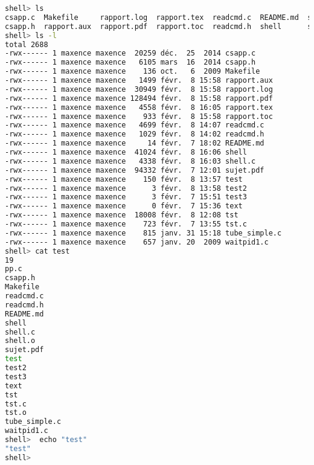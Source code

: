 \documentclass{report}
\begin{document}
		\begin{lstlisting}[frame=single,basicstyle=\footnotesize,language=bash]
shell> ls
csapp.c  Makefile     rapport.log  rapport.tex	readcmd.c  README.md  shell.c	 test	test3  tst    tube_simple.c
csapp.h  rapport.aux  rapport.pdf  rapport.toc	readcmd.h  shell      sujet.pdf  test2	text   tst.c  waitpid1.c
shell> ls -l
total 2688
-rwx------ 1 maxence maxence  20259 déc.  25  2014 csapp.c
-rwx------ 1 maxence maxence   6105 mars  16  2014 csapp.h
-rwx------ 1 maxence maxence    136 oct.   6  2009 Makefile
-rwx------ 1 maxence maxence   1499 févr.  8 15:58 rapport.aux
-rwx------ 1 maxence maxence  30949 févr.  8 15:58 rapport.log
-rwx------ 1 maxence maxence 128494 févr.  8 15:58 rapport.pdf
-rwx------ 1 maxence maxence   4558 févr.  8 16:05 rapport.tex
-rwx------ 1 maxence maxence    933 févr.  8 15:58 rapport.toc
-rwx------ 1 maxence maxence   4699 févr.  8 14:07 readcmd.c
-rwx------ 1 maxence maxence   1029 févr.  8 14:02 readcmd.h
-rwx------ 1 maxence maxence     14 févr.  7 18:02 README.md
-rwx------ 1 maxence maxence  41024 févr.  8 16:06 shell
-rwx------ 1 maxence maxence   4338 févr.  8 16:03 shell.c
-rwx------ 1 maxence maxence  94332 févr.  7 12:01 sujet.pdf
-rwx------ 1 maxence maxence    150 févr.  8 13:57 test
-rwx------ 1 maxence maxence      3 févr.  8 13:58 test2
-rwx------ 1 maxence maxence      3 févr.  7 15:51 test3
-rwx------ 1 maxence maxence      0 févr.  7 15:36 text
-rwx------ 1 maxence maxence  18008 févr.  8 12:08 tst
-rwx------ 1 maxence maxence    723 févr.  7 13:55 tst.c
-rwx------ 1 maxence maxence    815 janv. 31 15:18 tube_simple.c
-rwx------ 1 maxence maxence    657 janv. 20  2009 waitpid1.c
shell> cat test
19
pp.c
csapp.h
Makefile
readcmd.c
readcmd.h
README.md
shell
shell.c
shell.o
sujet.pdf
test
test2
test3
text
tst
tst.c
tst.o
tube_simple.c
waitpid1.c
shell>  echo "test"
"test"
shell>
		\end{lstlisting}
\end{document}
